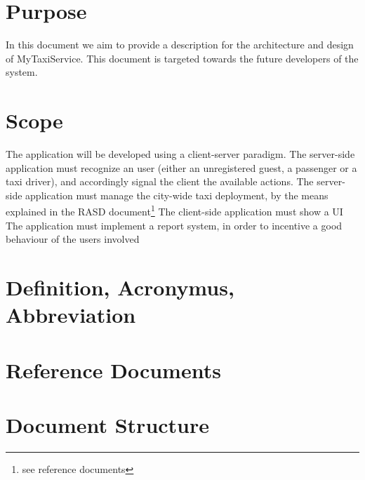 \section{Purpose}
In this document we aim to provide a description for the architecture and design of MyTaxiService.
This document is targeted towards the future developers of the system.

\section{Scope}
The application will be developed using a client-server paradigm.
The server-side application must recognize an user (either an unregistered guest, a passenger or a taxi driver), and accordingly signal the client the available actions.
The server-side application must manage the city-wide taxi deployment, by the means explained in the RASD document\footnote{see reference documents}
The client-side application must show a UI 
The application must implement a report  system, in order to incentive a good behaviour of the users involved

\section{Definition, Acronymus, Abbreviation}


\section{Reference Documents}

\section{Document Structure}
